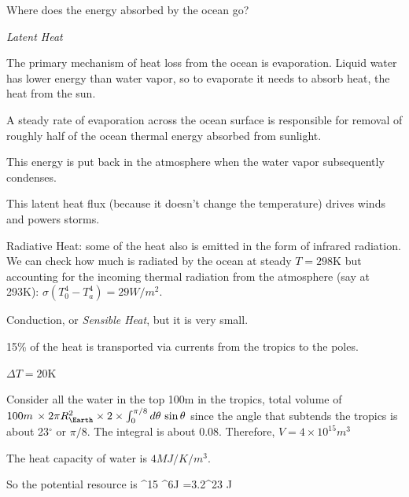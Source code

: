 \documentclass[11pt]{book}
\begin{document}
Where does the energy absorbed by the ocean go? 
\bei
\item {\it Latent Heat} 
\bee
\item The primary mechanism of heat loss from the ocean is evaporation. Liquid water has lower energy than water vapor, so to evaporate it needs to absorb heat, the heat from the sun. 
\item A steady rate of evaporation across the ocean surface is responsible for removal of roughly half of the ocean thermal energy absorbed from sunlight. 
\item This energy is put back in the atmosphere when the water vapor subsequently condenses. 
\item This latent heat flux (because it doesn't change the temperature) drives winds and powers storms.
\eee
\item Radiative Heat: some of the heat also is emitted in the form of infrared radiation. We can check how much is radiated by the ocean at steady $T=298$K but accounting for the incoming thermal radiation from the atmosphere (say at 293K): $\sigma (T_0^4-T_a^4)= 29W/m^2$.
\item Conduction, or {\it Sensible Heat}, but it is very small.
\item 15\% of the heat is transported via currents from the tropics to the poles.
\eei


\bei
\item $\Delta T=20$K
\item Consider all the water in the top 100m in the tropics, total volume of $100m\,\times 2\pi R_\Earth^2  \times 2\times\int_0^{\pi/8} d\theta\,\sin\theta$ since the angle that subtends the tropics is about 23$^\circ$ or $\pi/8$. The integral is about 0.08. Therefore, $V=4\times 10^{15}m^3$
\item The heat capacity of water is $4 MJ/K/m^3$.
\item So the potential resource is 
^{15} ^6J =3.2^{23} J\ee
\eei



\end{document}
